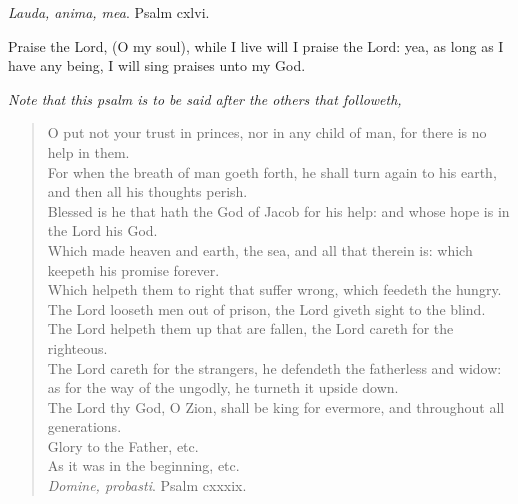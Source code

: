 \documentclass[
]{book}
\begin{document}
\emph{Lauda, anima, mea}. Psalm cxlvi.

Praise the Lord, (O my soul), while I live will I praise the Lord: yea, as long as I have any being, I will sing praises unto my God.

\emph{Note that this psalm is to be said after the others that followeth,}

\begin{quote}
O put not your trust in princes, nor in any child of man, for there is no help in them.\\
For when the breath of man goeth forth, he shall turn again to his earth, and then all his thoughts perish.\\
Blessed is he that hath the God of Jacob for his help: and whose hope is in the Lord his God.\\
Which made heaven and earth, the sea, and all that therein is: which keepeth his promise forever.\\
Which helpeth them to right that suffer wrong, which feedeth the hungry.\\
The Lord looseth men out of prison, the Lord giveth sight to the blind.\\
The Lord helpeth them up that are fallen, the Lord careth for the righteous.\\
The Lord careth for the strangers, he defendeth the fatherless and widow: as for the way of the ungodly, he turneth it upside down.\\
The Lord thy God, O Zion, shall be king for evermore, and throughout all generations.\\
Glory to the Father, etc.\\
As it was in the beginning, etc.\\

\emph{Domine, probasti}. Psalm cxxxix.


\end{quote}
\end{document}
